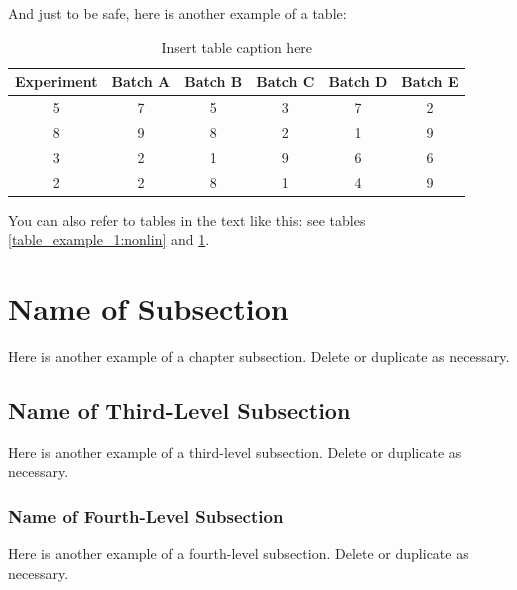 And just to be safe, here is another example of a table:

\begin{table}[h]
\caption{Insert table caption here} 
\centering 
\begin{tabular}{c c c c c c} 
\hline\hline 
Experiment & Batch A & Batch B & Batch C & Batch D & Batch E \\ [0.5ex] 
\hline 
5 & 7 & 5 & 3 & 7 & 2 \\
8 & 9 & 8 & 2 & 1 & 9 \\
3 & 2 & 1 & 9 & 6 & 6 \\
2 & 2 & 8 & 1 & 4 & 9 \\ [1ex] 
\hline 
\end{tabular}
\label{table_example_2:nonlin}
\end{table}


You can also refer to tables in the text like this: see tables \ref{table_example_1:nonlin} and \ref{table_example_2:nonlin}.

\section{Name of Subsection}
Here is another example of a chapter subsection. Delete or duplicate as necessary.

\subsection{Name of Third-Level Subsection}
Here is another example of a third-level subsection. Delete or duplicate as necessary.

\subsubsection{Name of Fourth-Level Subsection}
Here is another example of a fourth-level subsection. Delete or duplicate as necessary.